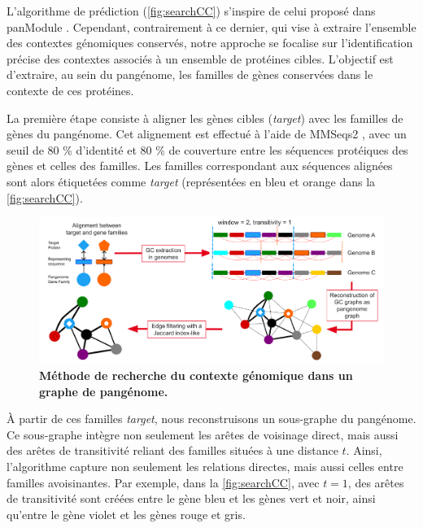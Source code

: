 L'algorithme de prédiction (\autoref{fig:searchCC}) s’inspire de celui proposé dans panModule \cite{bazin_panmodule_2021}. Cependant, contrairement à ce dernier, qui vise à extraire l’ensemble des contextes génomiques conservés, notre approche se focalise sur l’identification précise des contextes associés à un ensemble de protéines cibles. L’objectif est d’extraire, au sein du pangénome, les familles de gènes conservées dans le contexte de ces protéines.

La première étape consiste à aligner les gènes cibles (\textit{target}) avec les familles de gènes du pangénome. Cet alignement est effectué à l’aide de MMSeqs2 \cite{steinegger_mmseqs2_2017}, avec un seuil de 80 \% d'identité et 80 \% de couverture entre les séquences protéiques des gènes et celles des familles. Les familles correspondant aux séquences alignées sont alors étiquetées comme \textit{target} (représentées en bleu et orange dans la \autoref{fig:searchCC}).

\begin{figure}[htbp]
    \centering
    \includegraphics[width=\linewidth]{images/searchCC.png}
    \caption[Méthode de recherche du contexte génomique dans un graphe de pangénome]{\textbf{Méthode de recherche du contexte génomique dans un graphe de pangénome.}}
    \label{fig:searchCC}
\end{figure}

\newpage
À partir de ces familles \textit{target}, nous reconstruisons un sous-graphe du pangénome. Ce sous-graphe intègre non seulement les arêtes de voisinage direct, mais aussi des arêtes de transitivité reliant des familles situées à une distance $t$. Ainsi, l’algorithme capture non seulement les relations directes, mais aussi celles entre familles avoisinantes. Par exemple, dans la \autoref{fig:searchCC}, avec $t=1$, des arêtes de transitivité sont créées entre le gène bleu et les gènes vert et noir, ainsi qu'entre le gène violet et les gènes rouge et gris.

